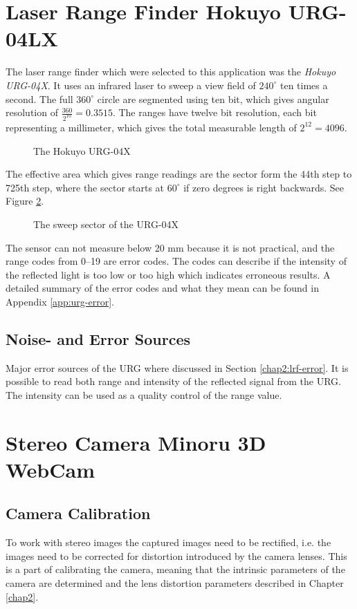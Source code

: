 \section{Laser Range Finder Hokuyo URG-04LX}
\label{chap3:sec-urg}
The laser range finder which were selected to this application was the \emph{Hokuyo
URG-04X}. It uses an infrared laser to sweep a view field of $240^\circ$ ten times a
second. The full $360^\circ$ circle are segmented using ten bit, which gives angular
resolution of $\frac{360}{2^{10}} = 0.3515$. The ranges have twelve bit resolution, each
bit representing a millimeter, which gives the total measurable length of $2^{12} = 4096$.
\begin{figure}[htbp]
    \centering
    \caption{The Hokuyo URG-04X}
    \label{chap3:fig-urg}
\end{figure}
The effective area which gives range readings are the sector form the 44th step to
725th step, where the sector starts at $60^\circ$ if zero degrees is right backwards. See
Figure \ref{chap3:fig-urg-sector}.
\begin{figure}[htbp]
    \centering
    \caption{The sweep sector of the URG-04X}
    \label{chap3:fig-urg-sector}
\end{figure}

The sensor can not measure below 20 mm because it is not practical, and the range codes
from 0--19 are error codes. The codes can describe if the intensity of the reflected light
is too low or too high which indicates erroneous results. A detailed summary of the
error codes and what they mean can be found in Appendix \ref{app:urg-error}.


\subsection{Noise- and Error Sources}
Major error sources of the URG where discussed in Section \ref{chap2:lrf-error}. It is
possible to read both range and intensity of the reflected signal from the URG. The
intensity can be used as a quality control of the range value. 





\section{Stereo Camera Minoru 3D WebCam}


\subsection{Camera Calibration}
To work with stereo images the captured images need to be rectified, i.e. the images need
to be corrected for distortion introduced by the camera lenses. This is a part of
calibrating the camera, meaning that the intrinsic parameters of the camera are
determined and the lens distortion parameters described in Chapter \ref{chap2}.

